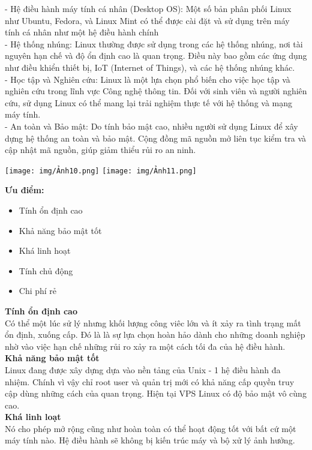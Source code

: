 \documentclass[12pt,a4paper]{article}
\begin{document}
- Hệ điều hành máy tính cá nhân (Desktop OS): Một số bản phân phối Linux như Ubuntu, Fedora, và Linux Mint có thể được cài đặt và sử dụng trên máy tính cá nhân như một hệ điều hành chính\\

- Hệ thống nhúng: Linux thường được sử dụng trong các hệ thống nhúng, nơi tài nguyên hạn chế và độ ổn định cao là quan trọng. Điều này bao gồm các ứng dụng như điều khiển thiết bị, IoT (Internet of Things), và các hệ thống nhúng khác. \\

- Học tập và Nghiên cứu: Linux là một lựa chọn phổ biến cho việc học tập và nghiên cứu trong lĩnh vực Công nghệ thông tin. Đối với sinh viên và người nghiên cứu, sử dụng Linux có thể mang lại trải nghiệm thực tế với hệ thống và mạng máy tính.\\

- An toàn và Bảo mật: Do tính bảo mật cao, nhiều người sử dụng Linux để xây dựng hệ thống an toàn và bảo mật. Cộng đồng mã nguồn mở liên tục kiểm tra và cập nhật mã nguồn, giúp giảm thiểu rủi ro an ninh.
\begin{center}
	\texttt{[image: img/Ảnh10.png]}
	\texttt{[image: img/Ảnh11.png]}
\end{center}
\textbf{Ưu điểm:}
\begin{itemize}
	\item Tính ổn định cao
	\item Khả năng bảo mật tốt
	\item Khá linh hoạt
	\item Tính chủ động
	\item Chi phí rẻ
\end{itemize}
\textbf{Tính ổn định cao} \\
Có thể một lúc sử lý nhưng khối lượng công viêc lớn và ít xảy ra tình trạng mất ổn định, xuống cấp. Đó là là sự lựa chọn hoàn hảo dành cho những doanh nghiệp nhờ vào việc hạn chế những rủi ro xảy ra một cách tối đa của hệ điều hành.\\

\textbf{Khả năng bảo mật tốt}\\
Linux đang được xây dựng dựa vào nền tảng của Unix - 1 hệ điều hành đa nhiệm. Chính vì vậy chỉ root user và quản trị mới có khả năng cấp quyền truy cập dùng những cách của quan trọng. Hiện tại VPS Linux có độ bảo mật vô cùng cao. \\

\textbf{Khá linh loạt}\\
Nó cho phép mở rộng cũng như hoàn toàn có thể hoạt động tốt với bất cứ một máy tính nào. Hệ điều hành sẽ không bị kiến trúc máy và bộ xử lý ảnh hưởng. \\
\end{document}

